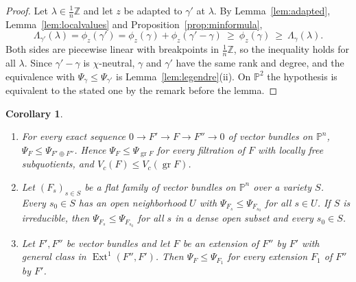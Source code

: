 \documentclass[11pt]{amsart}
\newtheorem{corollary}[theorem]{Corollary}
\theoremstyle{definition}
\theoremstyle{remark}
\newcommand{\PP}{\mathbb{P}}
\newcommand{\ZZ}{\mathbb{Z}}
\DeclareMathOperator{\gr}{gr}
\DeclareMathOperator{\Ext}{Ext}
\begin{document}
\begin{proof}
Let $\lambda\in\frac1n\ZZ$ and let $z$ be adapted to $\gamma'$ at $\lambda$. By Lemma~\ref{lem:adapted}, Lemma~\ref{lem:localvalues} and Proposition~\ref{prop:minformula},
\[
\Lambda_{\gamma'}(\lambda)=\phi_z(\gamma')=\phi_z(\gamma)+\phi_z(\gamma'-\gamma)\ \ge\ \phi_z(\gamma)\ \ge\ \Lambda_\gamma(\lambda).
\]
Both sides are piecewise linear with breakpoints in $\frac1n\ZZ$, so the inequality holds for all $\lambda$. Since $\gamma'-\gamma$ is $\chi$-neutral, $\gamma$ and $\gamma'$ have the same rank and degree, and the equivalence with $\Psi_\gamma\le\Psi_{\gamma'}$ is Lemma~\ref{lem:legendre}(ii). On $\PP^2$ the hypothesis is equivalent to the stated one by the remark before the lemma.
\end{proof}

\begin{corollary}\label{cor:monoext}
\begin{enumerate}[label=\textup{(\alph*)}]
\item For every exact sequence $0\to F'\to F\to F''\to0$ of vector bundles on $\PP^n$, $\Psi_F\le\Psi_{F'\oplus F''}$. Hence $\Psi_F\le\Psi_{\gr F}$ for every filtration of $F$ with locally free subquotients, and $V_c(F)\le V_c(\gr F)$.
\item Let $(F_s)_{s\in S}$ be a flat family of vector bundles on $\PP^n$ over a variety $S$. Every $s_0\in S$ has an open neighborhood $U$ with $\Psi_{F_s}\le\Psi_{F_{s_0}}$ for all $s\in U$. If $S$ is irreducible, then $\Psi_{F_s}\le\Psi_{F_{s_0}}$ for all $s$ in a dense open subset and every $s_0\in S$.
\item Let $F',F''$ be vector bundles and let $F$ be an extension of $F''$ by $F'$ with general class in $\Ext^1(F'',F')$. Then $\Psi_F\le\Psi_{F_1}$ for every extension $F_1$ of $F''$ by $F'$.
\end{enumerate}
\end{corollary}
\end{document}
